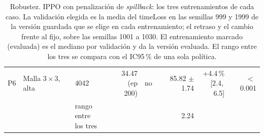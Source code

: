 \begin{table}[H]
\begin{tabular}{lllrlrrr}
P6 & \makecell[l]{Malla $3 \times 3$,\\{}alta} & 4042 & \makecell[r]{34.47\\{}(ep 200)} & no & \makecell[r]{85.82\\{}$\pm$ 1.74} & \makecell[r]{+4.4\,\%\\{}[2.4,\,6.5]} & $<$\,0.001 \\
 & & \makecell[l]{rango entre\\{}los tres} & & & 2.24 & & \\
\bottomrule
\end{tabular}
\caption[Robustez: entrenamientos de IPPO con penalización de \textit{spillback}]{Robustez. IPPO con penalización de \textit{spillback}: los tres entrenamientos de cada caso. La validación elegida es la media del timeLoss en las semillas 999 y 1999 de la versión guardada que se elige en cada entrenamiento; el retraso y el cambio frente al fijo, sobre las semillas 1001 a 1030. El entrenamiento marcado (evaluada) es el mediano por validación y da la versión evaluada. El rango entre los tres se compara con el IC95\,\% de una sola política.}
\label{tab:robustez-veredicto-bases-ippo-spill}
\end{table}

